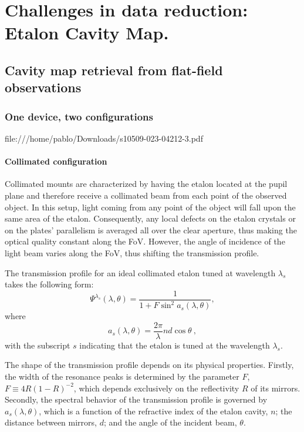 \chapter{\label{CH:challenges}Challenges in data reduction: Etalon Cavity Map.}

\section{\label{ch3: cavity map}Cavity map retrieval from flat-field observations}



\subsection{One device, two configurations}

file:///home/pablo/Downloads/s10509-023-04212-3.pdf



\subsubsection{Collimated configuration}

Collimated mounts are characterized by having the etalon located at the pupil plane and therefore receive a collimated beam from each point of the observed object. In this setup, light coming from any point of the object will fall upon the same area of the etalon. Consequently, any local defects on the etalon crystals or on the plates' parallelism is averaged all over the clear aperture, thus making the optical quality constant along the FoV. However, the angle of incidence of the light beam varies along the FoV, thus shifting the transmission profile.  

 The transmission profile for an ideal collimated etalon tuned at wavelength $\lambda _ s$ takes the following form:
\begin{equation}
\Psi ^{\lambda _ s} (\lambda, \theta) = \frac{1}{1 + F \sin ^2 a_s (\lambda,\theta) },
\end{equation}
where
\begin{equation}
a_s (\lambda, \theta) =\frac{2  \pi}{\lambda} nd\cos \theta  \ ,
\label{eq: a-def}
\end{equation}
with the subscript $s$ indicating that the etalon is tuned at the wavelength $\lambda_s$.

The shape of the transmission profile depends on its physical properties. Firstly, the width of the resonance peaks is determined by the parameter $F$, $F \equiv 4R (1 - R )^{-2}$, which depends exclusively on the reflectivity $R$ of its mirrors. Secondly, the spectral behavior of the transmission profile is governed by $a_s(\lambda,\theta)$, which is a function of the refractive index of the etalon cavity, $n$; the distance between mirrors, $d$; and the angle of the incident beam, $\theta$. 

